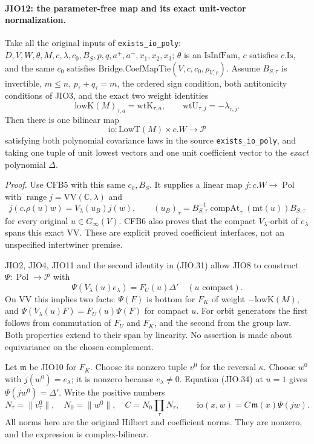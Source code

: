 \paragraph{JIO12: the parameter-free map and its exact unit-vector normalization.}
\label{claim:JIO12}
Take all the original inputs of \texttt{exists\_io\_poly}:
\(D,V,W,\theta,M,c,\lambda,c_0,B_S,p,q,a^+,a^-,x_1,x_2,x_3\);
\(\theta\) is an \(\mathrm{IsInfFam}\), \(c\) satisfies \(c.\mathrm{Is}\),
and the same \(c_0\) satisfies
\(\mathrm{Bridge.CoefMapTie}(V,c,c_0,\rho_{V,r})\).
Assume \(B_{S,\tau}\) is invertible, \(m\le n\), \(p_\tau+q_\tau=m\),
the ordered sign condition, both antitonicity conditions of JIO3,
and the exact two weight identities
\[
       \mathrm{lowK}(M)_{\tau,a}=\mathrm{wtK}_{\tau,a},
              \qquad \mathrm{wtU}_{\tau,j}=-\lambda_{\tau,j}.
 \tag{JIO.31}
\]
Then there is one bilinear map
\[
           \mathrm{io}:\mathrm{LowT}(M)\times c.W
                                  \longrightarrow\mathcal P
 \tag{JIO.32}
\]
satisfying both polynomial covariance laws in the source
\texttt{exists\_io\_poly}, and taking one tuple of unit lowest
vectors and one unit coefficient vector to the \emph{exact}
polynomial \(\Delta\).

\emph{Proof.}
Use CFB5 with this same \(c_0,B_S\).
It supplies a linear map \(j:c.W\to\operatorname{Pol}\) with
\(\operatorname{range}j=\mathrm{VV}(\mathbb C,\lambda)\) and
\[
 j(c.\rho(u)w)=V_\lambda(u_B)j(w),\qquad
 (u_B)_\tau=B_{S,\tau}^{-1}
                     \operatorname{compAt}_\tau(\mathrm{mt}(u))
                       B_{S,\tau}
 \tag{JIO.33}
\]
for every original \(u\in G_\infty(V)\).
CFB6 also proves that the compact \(V_\lambda\)-orbit of
\(e_\lambda\) spans this exact \(\mathrm{VV}\).
These are explicit proved coefficient interfaces, not an
unspecified intertwiner premise.

JIO2, JIO4, JIO11 and the second identity in (JIO.31) allow
JIO8 to construct
\(\Psi:\operatorname{Pol}\to\mathcal P\) with
\[
             \Psi(V_\lambda(u)e_\lambda)=F_U(u)\Delta'
                      \quad(u\text{ compact}).
 \tag{JIO.34}
\]
On \(\mathrm{VV}\) this implies two facts:
\(\Psi(F)\) is bottom for \(F_K\) of weight
\(-\mathrm{lowK}(M)\), and
\(\Psi(V_\lambda(u)F)=F_U(u)\Psi(F)\) for compact \(u\).
For orbit generators the first follows from commutation of
\(F_U\) and \(F_K\), and the second from the group law.
Both properties extend to their span by linearity.
No assertion is made about equivariance on the chosen complement.

Let \(\mathfrak m\) be JIO10 for \(F_K\).
Choose its nonzero tuple \(v^0\) for the reversal \(\kappa\).
Choose \(w^0\) with \(j(w^0)=e_\lambda\); it is nonzero because
\(e_\lambda\ne0\).  Equation (JIO.34) at \(u=1\) gives
\(\Psi(jw^0)=\Delta'\).
Write the positive numbers
\[
 N_\tau=\|v^0_\tau\|,\quad N_0=\|w^0\|,\quad
 C=N_0\prod_\tau N_\tau,\qquad
          \mathrm{io}(x,w)=C\,\mathfrak m(x)\Psi(jw).
 \tag{JIO.35}
\]
All norms here are the original Hilbert and coefficient norms.
They are nonzero, and the expression is complex-bilinear.

